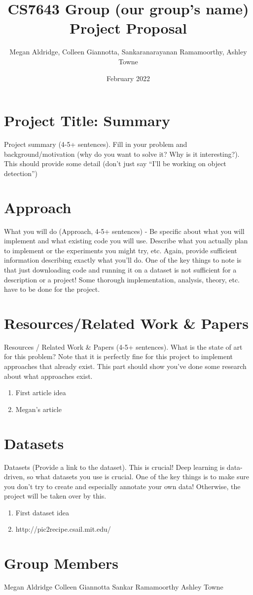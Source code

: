 \documentclass{article}
\title{CS7643 Group (our group's name) Project Proposal}
\author{Megan Aldridge, Colleen Giannotta, Sankaranarayanan Ramamoorthy, Ashley Towne}
\date{February 2022}
\begin{document}
\maketitle

\section{Project Title: Summary}

Project summary (4-5+ sentences). Fill in your problem and background/motivation (why do you want to solve it? Why is it interesting?). This should provide some detail (don’t just say “I’ll  be working on object detection”)

\section{Approach}
What you will do (Approach, 4-5+ sentences) - Be specific about what you will implement and what existing code you will use. Describe what you actually plan to implement or the experiments you might try, etc. Again, provide sufficient information describing exactly what you’ll do. One of the key things to note is that just downloading code and running it on a dataset is not sufficient for a description or a project! Some thorough implementation, analysis, theory, etc. have to be done for the project.

\section{Resources/Related Work & Papers}
Resources / Related Work & Papers (4-5+ sentences). What is the state of art for this problem? Note that it is perfectly fine for this project to implement approaches that already exist. This part should show you’ve done some research about what approaches exist.

\begin{enumerate}
    \item First article idea
    \item Megan's article
\end{enumerate}

\section{Datasets}
Datasets (Provide a link to the dataset). This is crucial! Deep learning is data-driven, so what datasets you use is crucial. One of the key things is to make sure you don’t try to create and especially annotate your own data! Otherwise, the project will be taken over by this.

\begin{enumerate}
    \item First dataset idea
    \item http://pic2recipe.csail.mit.edu/
\end{enumerate}

\section{Group Members}
Megan Aldridge
Colleen Giannotta
Sankar Ramamoorthy
Ashley Towne
\end{document}
